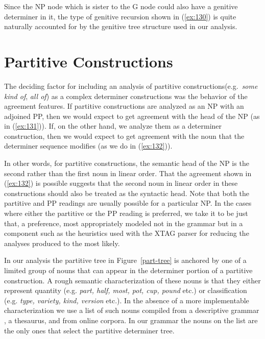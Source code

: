 Since the NP node which is sister 
to the G node could also have a genitive determiner in it, the type of 
genitive recursion shown in (\ref{ex:130}) is quite naturally accounted for 
by the genitive tree structure used in our analysis. 
 
\section{Partitive Constructions}        
\label{partitives}                        
 
The deciding factor for including an analysis of partitive constructions(e.g.\ {\it some kind of}, {\it all of\/}) as a complex determiner constructions was the 
behavior of the agreement features.  If partitive constructions are analyzed as 
an NP with an adjoined PP, then we would expect to get agreement with the head 
of the NP (as in ({\ref{ex:131}})).  If, on the other hand, we analyze them 
as a determiner construction, then we would expect to get agreement with the 
noun that the determiner sequence modifies (as we do in ({\ref{ex:132}})). 
 
\beginsentences
{}\label{ex:131} 
\label{ex:132} 
\endsentences

 
In other words, for partitive constructions, the semantic head of the NP is the second rather than the first noun in linear order. That the agreement shown in ({\ref{ex:132}}) is possible suggests that the second noun in linear order in these constructions should also be treated as the syntactic head. Note that both the partitive and PP readings are usually possible for a particular NP. In the cases where either the partitive or the PP reading is preferred, we take it to be just that, a preference, most appropriately modeled not in the grammar but in a component such as the heuristics used with the XTAG parser for reducing the analyses produced to the most likely. 
 
In our analysis the partitive tree in Figure~\ref{part-tree} is anchored 
by one of a limited group of nouns that can appear in the determiner 
portion of a partitive construction. A rough semantic characterization 
of these nouns is that they either represent quantity (e.g. {\it part, half, most, pot, cup, pound} etc.) or classification (e.g. {\it type, variety, kind, version} etc.).  In the absence of a more implementable 
characterization we use a list of such nouns compiled from a 
descriptive grammar \cite{quirk85}, a thesaurus, and from online 
corpora. In our grammar the nouns on the list are the only ones that 
select the partitive determiner tree. 
 
